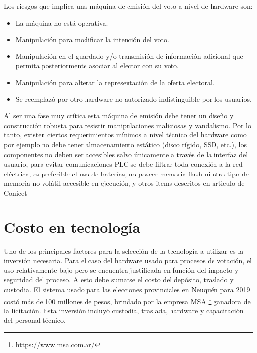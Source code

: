 Los riesgos que implica una máquina de emisión del voto a nivel de hardware son:
\begin{itemize}
    \item La máquina no está operativa.
    \item Manipulación para modificar la intención del voto.
    \item Manipulación en el guardado y/o transmisión de información adicional que permita posteriormente asociar al elector con su voto.
    \item Manipulación para alterar la representación de la oferta electoral.
    \item Se reemplazó por otro hardware no autorizado indistinguible por los usuarios.
\end{itemize}
Al ser una fase muy crítica esta máquina de emisión debe tener un diseño y construcción robusta para resistir manipulaciones maliciosas y vandalismo. Por lo tanto, existen ciertos requerimientos mínimos a nivel técnico del hardware como por ejemplo no debe tener almacenamiento estático (disco rígido, SSD, etc.), los componentes no deben ser accesibles salvo únicamente a través de la interfaz del usuario, para evitar comunicaciones PLC se debe filtrar toda conexión a la red eléctrica, es preferible el uso de baterías, no poseer memoria flash ni otro tipo de memoria no-volátil accesible en ejecución, y otros items descritos en articulo de Conicet \cite{conicet}

\section{Costo en tecnología}
Uno de los principales factores para la selección de la tecnología a utilizar es la inversión necesaria. Para el caso del hardware usado para procesos de votación, el uso relativamente bajo pero se encuentra justificada en función del impacto y seguridad del proceso. A esto debe sumarse el costo del depósito, traslado y custodia. \newline
El sistema usado para las elecciones provinciales en Neuquén para 2019 costó más de 100 millones de pesos, brindado por la empresa MSA \footnote{https://www.msa.com.ar/} ganadora de la licitación. Esta inversión incluyó custodia, traslada, hardware y capacitación del personal técnico.\cite{eleccionesNeuquen}
